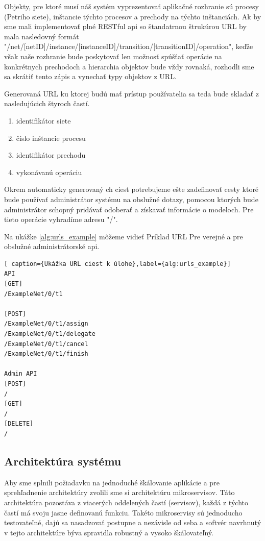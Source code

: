 Objekty, pre ktoré musí náš systém vyprezentovať aplikačné rozhranie sú  procesy (Petriho siete), inštancie týchto procesov a prechody na týchto inštanciách. Ak by sme mali implementovať plné RESTful \acrshort{api} so štandatrnou štrukúrou URL by mala nasledovný formát 
"/net/[netID]/instance/[instanceID]/transition/[transitionID]/operation",  keďže však naše rozhranie bude poskytovať len možnosť spúšťať operácie na konkrétnych prechodoch a hierarchia objektov bude vždy rovnaká, rozhodli sme sa skrátiť tento zápis a vynechať typy objektov z URL.

Generovaná URL ku ktorej budú mať prístup používatelia sa teda bude skladať z nasledujúcich štyroch častí.
\begin{enumerate}
\item identifikátor siete
\item číslo inštancie procesu
\item identifikátor prechodu
\item vykonávanú operáciu
\end{enumerate}

Okrem automaticky generovaný ch ciest potrebujeme ešte zadefinovať cesty ktoré bude používať administrátor systému na obslužné dotazy, pomocou ktorých bude administrátor schopný pridávať odoberať a získavať informácie o modeloch. Pre tieto operácie vyhradíme adresu "/".

Na ukážke \ref{alg:urls_example} môžeme vidieť  Príklad URL Pre verejné a pre obslužné administrátorské \acrshort{api}.

\begin{lstlisting}[ caption={Ukážka URL ciest k úlohe},label={alg:urls_example}]
API 
[GET] 
/ExampleNet/0/t1

[POST] 
/ExampleNet/0/t1/assign
/ExampleNet/0/t1/delegate
/ExampleNet/0/t1/cancel
/ExampleNet/0/t1/finish

Admin API
[POST] 
/
[GET] 
/
[DELETE] 
/
\end{lstlisting}


\subsection{Architektúra systému}
Aby sme splnili požiadavku na jednoduché škálovanie aplikácie a pre sprehľadnenie architektúry zvolili sme si architektúru mikroservisov. Táto architektúra pozostáva z viacerých oddelených častí (servisov), každá z týchto častí má svoju jasne definovanú funkciu. Takéto mikroservisy sú jednoducho testovateľné, dajú sa nasadzovať postupne a nezávisle od seba a softvér navrhnutý v tejto architektúre býva spravidla robustný a vysoko škálovateľný.

